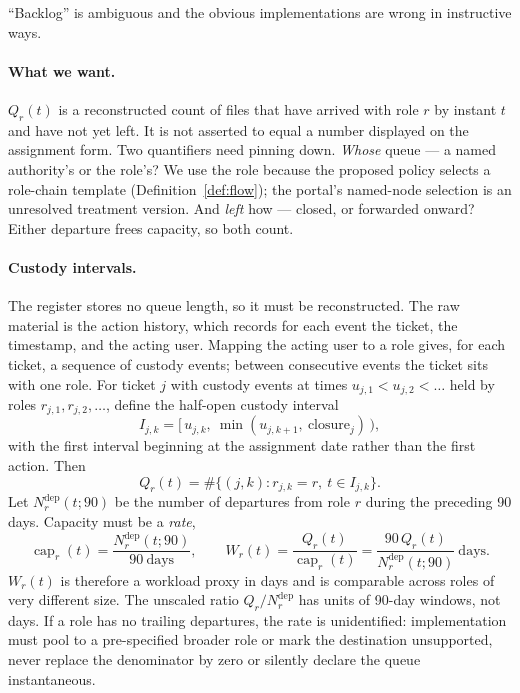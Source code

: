 \documentclass[11pt,a4paper]{article}
\theoremstyle{plain}
\theoremstyle{definition}
\theoremstyle{remark}
\begin{document}
``Backlog'' is ambiguous and the obvious implementations are wrong in instructive ways.

\paragraph{What we want.} $Q_r(t)$ is a reconstructed count of files that have arrived with
role $r$ by instant $t$ and have not yet left. It is not asserted to equal a number displayed on
the assignment form. Two quantifiers need pinning down. \emph{Whose} queue --- a named
authority's or the role's? We use the role because the proposed policy selects a role-chain
template (Definition~\ref{def:flow}); the portal's named-node selection is an unresolved
treatment version. And \emph{left} how --- closed, or forwarded onward? Either departure frees
capacity, so both count.

\paragraph{Custody intervals.} The register stores no queue length, so it must be
reconstructed. The raw material is the action history, which records for each event the
ticket, the timestamp, and the acting user. Mapping the acting user to a role gives, for each
ticket, a sequence of custody events; between consecutive events the ticket sits with one
role. For ticket $j$ with custody events at times $u_{j,1}<u_{j,2}<\dots$ held by roles
$r_{j,1},r_{j,2},\dots$, define the half-open custody interval
\[
I_{j,k} = \bigl[\,u_{j,k},\ \min(u_{j,k+1},\ \text{closure}_j)\,\bigr),
\]
with the first interval beginning at the assignment date rather than the first action. Then
\begin{equation}
Q_r(t) = \#\bigl\{(j,k) : r_{j,k}=r,\ t\in I_{j,k}\bigr\}.
\label{eq:Q}
\end{equation}
Let $N^{\mathrm{dep}}_r(t;90)$ be the number of departures from role $r$ during the preceding
90 days. Capacity must be a \emph{rate},
\[
\operatorname{cap}_r(t)=\frac{N^{\mathrm{dep}}_r(t;90)}{90\ \text{days}},
\qquad
W_r(t)=\frac{Q_r(t)}{\operatorname{cap}_r(t)}
=\frac{90\,Q_r(t)}{N^{\mathrm{dep}}_r(t;90)}\ \text{days}.
\]
$W_r(t)$ is therefore a workload proxy in days and is comparable across roles of very
different size. The unscaled ratio $Q_r/N^{\mathrm{dep}}_r$ has units of 90-day windows, not
days. If a role has no trailing departures, the rate is unidentified: implementation must pool
to a pre-specified broader role or mark the destination unsupported, never replace the
denominator by zero or silently declare the queue instantaneous.
\end{document}

